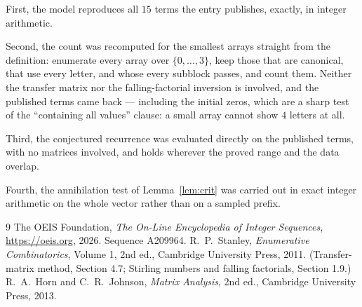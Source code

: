 \documentclass[11pt,a4paper]{article}
\theoremstyle{plain}
\theoremstyle{definition}
\begin{document}
First, the model reproduces all $15$ terms the entry publishes, exactly, in integer
arithmetic.

Second, the count was recomputed for the smallest arrays straight from the definition:
enumerate every array over $\{0,\dots,3\}$, keep those that are canonical, that use every
letter, and whose every subblock passes, and count them. Neither the transfer matrix nor the
falling-factorial inversion is involved, and the published terms came back --- including the
initial zeros, which are a sharp test of the ``containing all values'' clause: a small array
cannot show $4$ letters at all.

Third, the conjectured recurrence was evaluated directly on the published terms, with no
matrices involved, and holds wherever the proved range and the data overlap.

Fourth, the annihilation test of Lemma~\ref{lem:crit} was carried out in exact integer
arithmetic on the whole vector rather than on a sampled prefix.

\begin{thebibliography}{9}
 The OEIS Foundation, \emph{The On-Line Encyclopedia of Integer
Sequences}, \url{https://oeis.org}, 2026. Sequence A209964.
 R.~P.~Stanley, \emph{Enumerative Combinatorics}, Volume 1, 2nd ed.,
Cambridge University Press, 2011. (Transfer-matrix method, Section 4.7; Stirling numbers and
falling factorials, Section 1.9.)
 R.~A.~Horn and C.~R.~Johnson, \emph{Matrix Analysis}, 2nd ed., Cambridge
University Press, 2013.
\end{thebibliography}
\end{document}
